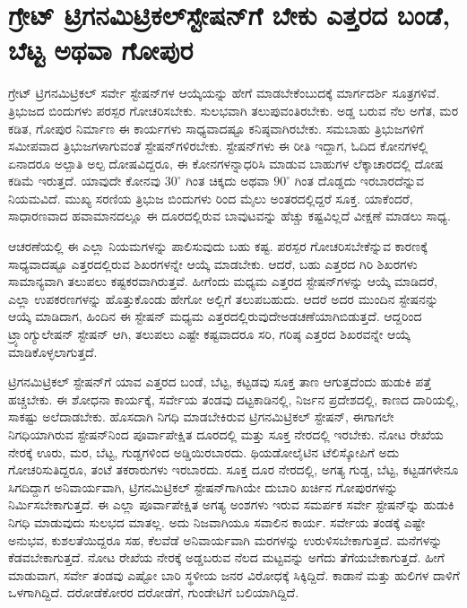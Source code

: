 
\chapter{ಗ್ರೇಟ್​ ಟ್ರಿಗನಮಿಟ್ರಿಕಲ್​ ಸ್ಟೇಷನ್​ಗೆ ಬೇಕು ಎತ್ತರದ ಬಂಡೆ, ಬೆಟ್ಟ ಅಥವಾ ಗೋಪುರ}

\vskip 7pt

ಗ್ರೇಟ್​ ಟ್ರಿಗನಮಿಟ್ರಿಕಲ್​ ಸರ್ವೇ ಸ್ಟೇಷನ್​ಗಳ ಆಯ್ಕೆಯನ್ನು ಹೇಗೆ ಮಾಡಬೇಕೆಂಬುದಕ್ಕೆ ಮಾರ್ಗದರ್ಶಿ ಸೂತ್ರಗಳಿವೆ. ತ್ರಿಭುಜದ ಬಿಂದುಗಳು ಪರಸ್ಪರ ಗೋಚರಿಸಬೇಕು. ಸುಲಭವಾಗಿ ತಲುಪುವಂತಿರಬೇಕು. ಅಡ್ಡ ಬರುವ ನೆಲ ಅಗೆತ, ಮರ ಕಡಿತ, ಗೋಪುರ ನಿರ್ಮಾಣ ಈ ಕಾರ್ಯಗಳು ಸಾಧ್ಯವಾದಷ್ಟೂ ಕನಿಷ್ಠವಾಗಿರಬೇಕು. ಸಮಬಾಹು ತ್ರಿಭುಜಗಳಿಗೆ ಸಮೀಪವಾದ ತ್ರಿಭುಜಗಳಾಗುವಂತೆ ಸ್ಟೇಷನ್​ಗಳಿರಬೇಕು. ಸ್ಟೇಷನ್​ಗಳು ಈ ರೀತಿ ಇದ್ದಾಗ, ಓದಿದ ಕೋನಗಳಲ್ಲಿ ಏನಾದರೂ ಅಲ್ಪಾತಿ ಅಲ್ಪ ದೋಷವಿದ್ದರೂ, ಈ ಕೋನಗಳನ್ನಾಧರಿಸಿ ಮಾಡುವ ಬಾಹುಗಳ ಲೆಕ್ಕಾಚಾರದಲ್ಲಿ ದೋಷ ಕಡಿಮೆ ಇರುತ್ತದೆ. ಯಾವುದೇ ಕೋನವು $30^\circ$ ಗಿಂತ ಚಿಕ್ಕದು ಅಥವಾ $90^\circ$ ಗಿಂತ ದೊಡ್ಡದು ಇರಬಾರದೆನ್ನುವ ನಿಯಮವಿದೆ. ಮುಖ್ಯ ಸರಣಿಯ ತ್ರಿಭುಜ ಬಿಂದುಗಳು  ರಿಂದ  ಮೈಲು ಅಂತರದಲ್ಲಿದ್ದರೆ ಸೂಕ್ತ. ಯಾಕೆಂದರೆ, ಸಾಧಾರಣವಾದ ಹವಾಮಾನದಲ್ಲೂ ಈ ದೂರದಲ್ಲಿರುವ ಬಾವುಟವನ್ನು ಹೆಚ್ಚು ಕಷ್ಟವಿಲ್ಲದೆ ವೀಕ್ಷಣೆ ಮಾಡಲು ಸಾಧ್ಯ.

\vskip 3pt

ಆಚರಣೆಯಲ್ಲಿ ಈ ಎಲ್ಲಾ ನಿಯಮಗಳನ್ನು ಪಾಲಿಸುವುದು ಬಹು ಕಷ್ಟ. ಪರಸ್ಪರ ಗೋಚರಿಸಬೇಕೆನ್ನುವ ಕಾರಣಕ್ಕೆ ಸಾಧ್ಯವಾದಷ್ಟೂ ಎತ್ತರದಲ್ಲಿರುವ ಶಿಖರಗಳನ್ನೇ ಆಯ್ಕೆ ಮಾಡಬೇಕು. ಆದರೆ, ಬಹು ಎತ್ತರದ ಗಿರಿ ಶಿಖರಗಳು ಸಾಮಾನ್ಯವಾಗಿ ತಲುಪಲು ಕಷ್ಟಕರವಾಗಿರುತ್ತವೆ. ಹೀಗೆಂದು ಮಧ್ಯಮ ಎತ್ತರದ ಸ್ಟೇಷನ್​ಗಳನ್ನು ಆಯ್ಕೆ ಮಾಡಿದರೆ, ಎಲ್ಲಾ ಉಪಕರಣಗಳನ್ನು ಹೊತ್ತುಕೊಂಡು ಹೇಗೋ ಅಲ್ಲಿಗೆ ತಲುಪಬಹುದು. ಆದರೆ ಅದರ ಮುಂದಿನ ಸ್ಟೇಷನನ್ನು ಆಯ್ಕೆ ಮಾಡಿದಾಗ, ಹಿಂದಿನ ಈ ಸ್ಟೇಷನ್​ ಮಧ್ಯಮ ಎತ್ತರದಲ್ಲಿರುವುದೇ\break ಅಡಚಣೆಯಾಗಿಬಿಡುತ್ತದೆ. ಆದ್ದರಿಂದ ಟ್ರ್ಯಾಂಗ್ಯುಲೇಷನ್​ ಸ್ಟೇಷನ್​ ಆಗಿ, ತಲುಪಲು ಎಷ್ಟೇ ಕಷ್ಟವಾದರೂ ಸರಿ, ಗರಿಷ್ಠ ಎತ್ತರದ ಶಿಖರವನ್ನೇ ಆಯ್ಕೆ ಮಾಡಿಕೊಳ್ಳಲಾಗುತ್ತದೆ.

ಟ್ರಿಗನಮಿಟ್ರಿಕಲ್​ ಸ್ಟೇಷನ್​ಗೆ ಯಾವ ಎತ್ತರದ ಬಂಡೆ, ಬೆಟ್ಟ, ಕಟ್ಟಡವು ಸೂಕ್ತ ತಾಣ ಆಗುತ್ತದೆಂದು ಹುಡುಕಿ ಪತ್ತೆ ಹಚ್ಚಬೇಕು. ಈ ಶೋಧನಾ ಕಾರ್ಯಕ್ಕೆ, ಸರ್ವೇಯ ತಂಡವು ದಟ್ಟಕಾಡಿನಲ್ಲಿ, ನಿರ್ಜನ ಪ್ರದೇಶದಲ್ಲಿ, ಕಾಣದ ದಾರಿಯಲ್ಲಿ, ಸಾಕಷ್ಟು ಅಲೆದಾಡಬೇಕು. ಹೊಸದಾಗಿ ನಿಗಧಿ ಮಾಡಬೇಕಿರುವ ಟ್ರಿಗನಮಿಟ್ರಿಕಲ್​ ಸ್ಟೇಷನ್​, ಈಗಾಗಲೇ ನಿಗಧಿಯಾಗಿರುವ ಸ್ಟೇಷನ್​ನಿಂದ ಪೂರ್ವಾಪೇಕ್ಷಿತ ದೂರದಲ್ಲಿ ಮತ್ತು ಸೂಕ್ತ ನೇರದಲ್ಲಿ ಇರಬೇಕು. ನೋಟ ರೇಖೆಯ ನೇರಕ್ಕೆ ಊರು, ಮರ, ಬೆಟ್ಟ, ಗುಡ್ಡಗಳಿಂದ ಅಡ್ಡಿಯಿರಬಾರದು. ಥಿಯಡೋಲೈಟಿನ ಟೆಲಿಸ್ಕೋಪಿಗೆ ಅದು ಗೋಚರಿಸುತಿದ್ದರೂ, ತಂಟೆ ತಕರಾರುಗಳು ಇರಬಾರದು. ಸೂಕ್ತ ದೂರ ನೇರದಲ್ಲಿ, ಅಗತ್ಯ ಗುಡ್ಡ, ಬೆಟ್ಟ, ಕಟ್ಟಡಗಳೇನೂ ಸಿಗದಿದ್ದಾಗ ಅನಿವಾರ್ಯವಾಗಿ, ಟ್ರಿಗನಮಿಟ್ರಿಕಲ್​ ಸ್ಟೇಷನ್​ಗಾಗಿಯೇ ದುಬಾರಿ ಖರ್ಚಿನ ಗೋಪುರಗಳನ್ನು ನಿರ್ಮಿಸಬೇಕಾಗುತ್ತದೆ. ಈ ಎಲ್ಲಾ ಪೂರ್ವಾಪೇಕ್ಷಿತ ಅಗತ್ಯ ಅಂಶಗಳು ಇರುವ ಸಮರ್ಪಕ ಸರ್ವೇ ಸ್ಟೇಷನ್​‌ನ್ನು ಹುಡುಕಿ ನಿಗಧಿ ಮಾಡುವುದು ಸುಲಭದ ಮಾತಲ್ಲ. ಅದು ನಿಜವಾಗಿಯೂ ಸವಾಲಿನ ಕಾರ್ಯ. ಸರ್ವೇಯ ತಂಡಕ್ಕೆ ಎಷ್ಟೇ ಅನುಭವ, ಕುಶಲತೆಯಿದ್ದರೂ ಸಹ, ಕೆಲವೆಡೆ ಅನಿವಾರ್ಯವಾಗಿ ಮರಗಳನ್ನು ಉರುಳಿಸಬೇಕಾಗುತ್ತದೆ. ಮನೆಗಳನ್ನು ಕೆಡವಬೇಕಾಗುತ್ತದೆ. ನೋಟ ರೇಖೆಯ ನೇರಕ್ಕೆ ಅಡ್ಡಬರುವ ನೆಲದ ಮಟ್ಟವನ್ನು ಅಗೆದು ತೆಗೆಯಬೇಕಾಗುತ್ತದೆ. ಹೀಗೆ ಮಾಡುವಾಗ, ಸರ್ವೇ ತಂಡವು ಎಷ್ಟೋ ಬಾರಿ ಸ್ಥಳೀಯ ಜನರ ವಿರೋಧಕ್ಕೆ ಸಿಕ್ಕಿದ್ದಿದೆ. ಕಾಡಾನೆ ಮತ್ತು ಹುಲಿಗಳ ದಾಳಿಗೆ ಒಳಗಾಗಿದ್ದಿದೆ. ದರೋಡೆಕೋರರ ದರೋಡೆಗೆ, ಗುಂಡೇಟಿಗೆ ಬಲಿಯಾಗಿದ್ದಿದೆ.

